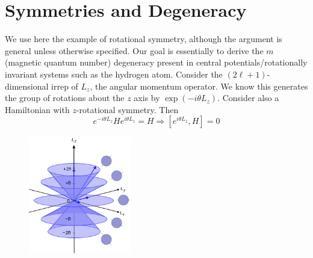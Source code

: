 \documentclass{report}
\begin{document}
\section{Symmetries and Degeneracy}\label{sec:symmetries-degeneracy}
We use here the example of rotational symmetry, although the argument is general 
unless otherwise specified. Our goal is essentially to derive the $ m $
(magnetic quantum number) degeneracy present in central potentials/rotationally
invariant systems such as the hydrogen atom. Consider the $ (2\ell + 1)
$-dimensional irrep of  $ L_z $, the angular momentum operator. We know this
generates the group of rotations about the $ z $ axis by $ \exp(-i\theta L_z) $.
Consider also a Hamiltonian with $ z $-rotational symmetry. Then
\begin{equation*}
	e^{-i \theta L_z} H e^{i\theta L_z}	= H 
	\Longrightarrow  
	\left[ e^{i\theta L_z}, H\right] = 0 
\end{equation*}

\begin{figure}
	\begin{center}
		\includegraphics[width=0.4\textwidth]{figs/march/500px-Vector_model_of_orbital_angular_momentum.svg.png}
		\caption{}
		\label{fig:spin}
	\end{center}
	\vspace*{-4em}
\end{figure}
\end{document}
